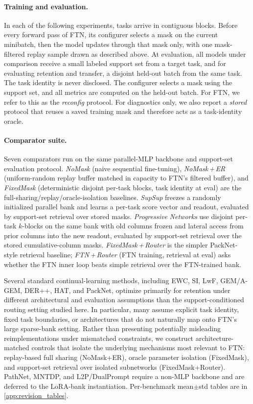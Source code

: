 \documentclass[11pt]{article}
\begin{document}
\paragraph{Training and evaluation.}
In each of the following experiments, tasks arrive in contiguous blocks. Before every forward pass of FTN, its configurer selects a mask on the current minibatch, then the model updates through that mask only, with one mask-filtered replay sample drawn as described above. At evaluation, all models under comparison receive a small labeled support set from a target task, and for evaluating retention and transfer, a disjoint held-out batch from the same task. The task identity is never disclosed. The configurer selects a mask using the support set, and all metrics are computed on the held-out batch. For FTN, we refer to this as the \emph{reconfig} protocol. For diagnostics only, we also report a \emph{stored} protocol that reuses a saved training mask and therefore acts as a task-identity oracle.

\paragraph{Comparator suite.}
Seven comparators run on the same parallel-MLP backbone and support-set evaluation protocol. \emph{NoMask} (naive sequential fine-tuning), \emph{NoMask\,+\,ER} (uniform-random replay buffer matched in capacity to FTN's filtered buffer), and \emph{FixedMask} (deterministic disjoint per-task blocks, task identity at eval) are the full-sharing/replay/oracle-isolation baselines. \emph{SupSup} \citep{wortsman2020supermasks} freezes a randomly initialized parallel bank and learns a per-task score vector and readout, evaluated by support-set retrieval over stored masks. \emph{Progressive Networks} \citep{rusu2016progressive} use disjoint per-task $k$-blocks on the same bank with old columns frozen and lateral access from prior columns into the new readout, evaluated by support-set retrieval over the stored cumulative-column masks. \emph{FixedMask\,+\,Router} is the simpler PackNet-style retrieval baseline; \emph{FTN\,+\,Router} (FTN training, retrieval at eval) asks whether the FTN inner loop beats simple retrieval over the FTN-trained bank.

Several standard continual-learning methods, including EWC, SI, LwF, GEM/A-GEM, DER++, HAT, and PackNet, optimize primarily for retention under different architectural and evaluation assumptions than the support-conditioned routing setting studied here. In particular, many assume explicit task identity, fixed task boundaries, or architectures that do not naturally map onto FTN's large sparse-bank setting. Rather than presenting potentially misleading reimplementations under mismatched constraints, we construct architecture-matched controls that isolate the underlying mechanisms most relevant to FTN: replay-based full sharing (NoMask+ER), oracle parameter isolation (FixedMask), and support-set retrieval over isolated subnetworks (FixedMask+Router). PathNet, MNTDP, and L2P/DualPrompt require a non-MLP backbone and are deferred to the LoRA-bank instantiation. Per-benchmark mean$\pm$std tables are in \cref{app:revision_tables}.
\end{document}
